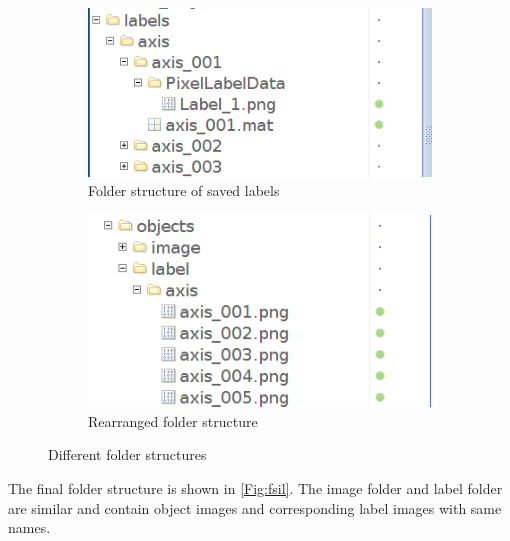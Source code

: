 \begin{center}
	\begin{figure}[!htb]
		\begin{subfigure}{.5\textwidth}
			\centering
			\includegraphics[width=1\linewidth]{images/folder_structure}
			\caption{Folder structure of saved labels}
			\label{Fig:fsa}
		\end{subfigure}
		\begin{subfigure}{.5\textwidth}
			\centering
			\includegraphics[width=1\linewidth]{images/folder_structure_aug}
			\caption{Rearranged folder structure}
			\label{Fig:fsb}
		\end{subfigure}
		\caption{Different folder structures}
		\label{Fig:fs}
	\end{figure}
\end{center}

The final folder structure is shown in \ref{Fig:fsil}. The image folder and label folder are similar and contain object images and corresponding label images with same names.

